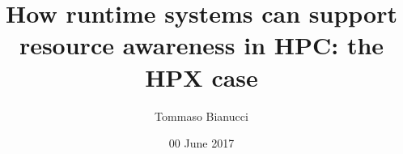 \documentclass[compress]{beamer}
\title[]{How runtime systems can support resource awareness in HPC: the HPX case}
\author{Tommaso Bianucci}
\date{00 June 2017}
\institute{Technische Universität München}
\begin{document}
\begin{frame}
\maketitle
\end{frame}




\end{document}
